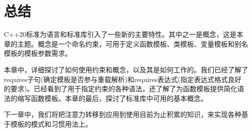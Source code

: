 \section{总结}
C++20标准为语言和标准库引入了一些新的主要特性。其中之一是概念，这是本章的主题。概念是一个命名约束，可用于定义函数模板、类模板、变量模板和别名模板的模板参数需求。

本章中，详细探讨了如何使用约束和概念，以及其是如何工作的。我们已经了解了requires子句(确定模板是否参与重载解析)和requires表达式(指定表达式格式良好的要求)。已经看到了用于指定约束的各种语法，还了解了为函数模板提供简化语法的缩写函数模板。本章的最后，探讨了标准库中可用的基本概念。

下一章中，我们将把注意力转移到应用到使用目前为止积累的知识，来实现各种基于模板的模式和习惯用法上。